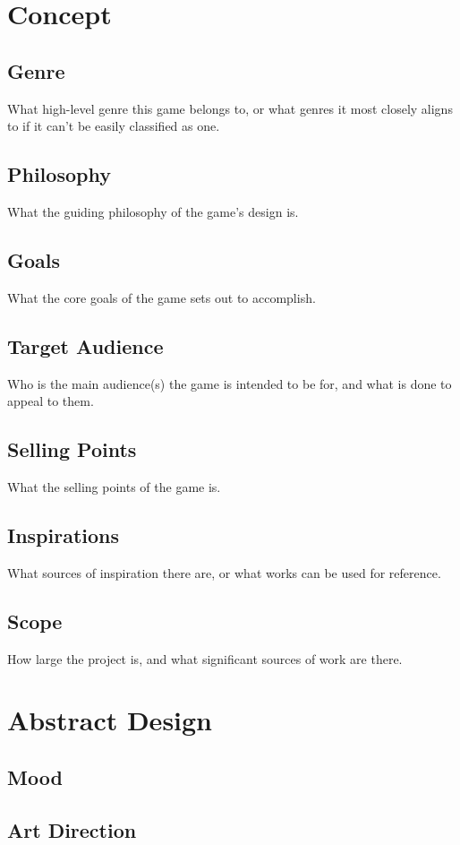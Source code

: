 



\section{Concept}
\subsection{Genre}
What high-level genre this game belongs to, or what genres it most closely aligns to if it can't be easily classified as one.
\subsection{Philosophy}
What the guiding philosophy of the game's design is.
\subsection{Goals}
What the core goals of the game sets out to accomplish.
\subsection{Target Audience}
Who is the main audience(s) the game is intended to be for, and what is done to appeal to them.
\subsection{Selling Points}
What the selling points of the game is.
\subsection{Inspirations}
What sources of inspiration there are, or what works can be used for reference.
\subsection{Scope}
How large the project is, and what significant sources of work are there.

\section{Abstract Design}
\subsection{Mood}
\subsection{Art Direction}

